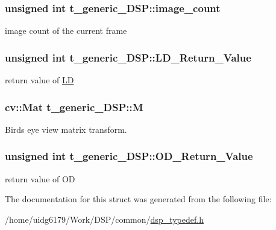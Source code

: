 \subsubsection[{\texorpdfstring{image\+\_\+count}{image_count}}]{\setlength{\rightskip}{0pt plus 5cm}unsigned int t\+\_\+generic\+\_\+\+D\+S\+P\+::image\+\_\+count}\hypertarget{structt__generic__DSP_a4f9e7a07b36c04b34ce3023e87419881}{}\label{structt__generic__DSP_a4f9e7a07b36c04b34ce3023e87419881}


image count of the current frame 

\subsubsection[{\texorpdfstring{L\+D\+\_\+\+Return\+\_\+\+Value}{LD_Return_Value}}]{\setlength{\rightskip}{0pt plus 5cm}unsigned int t\+\_\+generic\+\_\+\+D\+S\+P\+::\+L\+D\+\_\+\+Return\+\_\+\+Value}\hypertarget{structt__generic__DSP_ae4d46f8770a618ec5e7eb5850344a42f}{}\label{structt__generic__DSP_ae4d46f8770a618ec5e7eb5850344a42f}


return value of \hyperlink{namespaceLD}{LD} 

\subsubsection[{\texorpdfstring{M}{M}}]{\setlength{\rightskip}{0pt plus 5cm}cv\+::\+Mat t\+\_\+generic\+\_\+\+D\+S\+P\+::M}\hypertarget{structt__generic__DSP_a8b4a706b72a4eba57bf88faf7195e25a}{}\label{structt__generic__DSP_a8b4a706b72a4eba57bf88faf7195e25a}


Birds eye view matrix transform. 

\subsubsection[{\texorpdfstring{O\+D\+\_\+\+Return\+\_\+\+Value}{OD_Return_Value}}]{\setlength{\rightskip}{0pt plus 5cm}unsigned int t\+\_\+generic\+\_\+\+D\+S\+P\+::\+O\+D\+\_\+\+Return\+\_\+\+Value}\hypertarget{structt__generic__DSP_aeb048fc4e3e269765c88686575bdbeab}{}\label{structt__generic__DSP_aeb048fc4e3e269765c88686575bdbeab}


return value of OD 



The documentation for this struct was generated from the following file\+:\begin{DoxyCompactItemize}
\item 
/home/uidg6179/\+Work/\+D\+S\+P/common/\hyperlink{dsp__typedef_8h}{dsp\+\_\+typedef.\+h}\end{DoxyCompactItemize}
